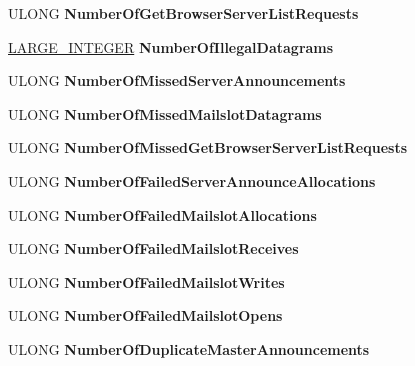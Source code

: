 \begin{DoxyCompactItemize}
U\+L\+O\+NG {\bfseries Number\+Of\+Get\+Browser\+Server\+List\+Requests}
\item 
\mbox{\label{struct___b_r_o_w_s_e_r___s_t_a_t_i_s_t_i_c_s__101_a6f18cf01359c469f458c10022d46f70e}} 
\hyperlink{union___l_a_r_g_e___i_n_t_e_g_e_r}{L\+A\+R\+G\+E\+\_\+\+I\+N\+T\+E\+G\+ER} {\bfseries Number\+Of\+Illegal\+Datagrams}
\item 
\mbox{\label{struct___b_r_o_w_s_e_r___s_t_a_t_i_s_t_i_c_s__101_a75d6067590d29cd06816be94efd2a699}} 
U\+L\+O\+NG {\bfseries Number\+Of\+Missed\+Server\+Announcements}
\item 
\mbox{\label{struct___b_r_o_w_s_e_r___s_t_a_t_i_s_t_i_c_s__101_af6993876e93c133adbbf51dec7fda0d9}} 
U\+L\+O\+NG {\bfseries Number\+Of\+Missed\+Mailslot\+Datagrams}
\item 
\mbox{\label{struct___b_r_o_w_s_e_r___s_t_a_t_i_s_t_i_c_s__101_ad2feacd98fa677daf5dba44a6c6eb8d8}} 
U\+L\+O\+NG {\bfseries Number\+Of\+Missed\+Get\+Browser\+Server\+List\+Requests}
\item 
\mbox{\label{struct___b_r_o_w_s_e_r___s_t_a_t_i_s_t_i_c_s__101_ad8511511dd864bce0148f9b2aa1ea649}} 
U\+L\+O\+NG {\bfseries Number\+Of\+Failed\+Server\+Announce\+Allocations}
\item 
\mbox{\label{struct___b_r_o_w_s_e_r___s_t_a_t_i_s_t_i_c_s__101_a2aedd23f4cc854014add685ecabc3d47}} 
U\+L\+O\+NG {\bfseries Number\+Of\+Failed\+Mailslot\+Allocations}
\item 
\mbox{\label{struct___b_r_o_w_s_e_r___s_t_a_t_i_s_t_i_c_s__101_ad93e932305ddcfbb5a0b19c848c4fab4}} 
U\+L\+O\+NG {\bfseries Number\+Of\+Failed\+Mailslot\+Receives}
\item 
\mbox{\label{struct___b_r_o_w_s_e_r___s_t_a_t_i_s_t_i_c_s__101_a1febb89ddfa477172365770373c596d9}} 
U\+L\+O\+NG {\bfseries Number\+Of\+Failed\+Mailslot\+Writes}
\item 
\mbox{\label{struct___b_r_o_w_s_e_r___s_t_a_t_i_s_t_i_c_s__101_a4cfc481c182a6936129fb28b69d85b74}} 
U\+L\+O\+NG {\bfseries Number\+Of\+Failed\+Mailslot\+Opens}
\item 
\mbox{\label{struct___b_r_o_w_s_e_r___s_t_a_t_i_s_t_i_c_s__101_a3883e6e78d66a123aae3acf559b56dcf}} 
U\+L\+O\+NG {\bfseries Number\+Of\+Duplicate\+Master\+Announcements}
\end{DoxyCompactItemize}


